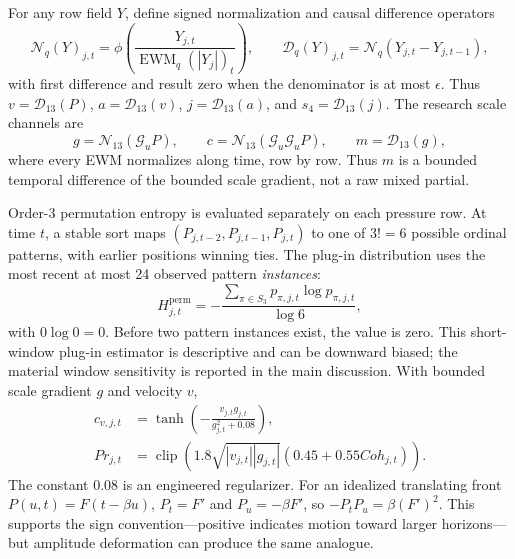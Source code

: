 \documentclass{article}
\newcommand{\pressure}{P}
\newcommand{\clip}{\operatorname{clip}}
\newcommand{\EWM}{\operatorname{EWM}}
\begin{document}
For any row field $Y$, define signed normalization and causal difference operators
\begin{equation}
\mathcal N_q(Y)_{j,t}=\phi\!\left(\frac{Y_{j,t}}{\EWM_q(|Y_j|)_t}\right),
\qquad
\mathcal D_q(Y)_{j,t}=\mathcal N_q(Y_{j,t}-Y_{j,t-1}),
\end{equation}
with first difference and result zero when the denominator is at most $\epsilon$. Thus $v=\mathcal D_{13}(\pressure)$, $a=\mathcal D_{13}(v)$, $j=\mathcal D_{13}(a)$, and $s_4=\mathcal D_{13}(j)$. The research scale channels are
\begin{equation}
g=\mathcal N_{13}(\mathcal G_u\pressure),\qquad
c=\mathcal N_{13}(\mathcal G_u\mathcal G_u\pressure),\qquad
m=\mathcal D_{13}(g),
\end{equation}
where every EWM normalizes along time, row by row. Thus $m$ is a bounded temporal difference of the bounded scale gradient, not a raw mixed partial.

Order-3 permutation entropy is evaluated separately on each pressure row. At time $t$, a stable sort maps $(\pressure_{j,t-2},\pressure_{j,t-1},\pressure_{j,t})$ to one of $3!=6$ possible ordinal patterns, with earlier positions winning ties. The plug-in distribution uses the most recent at most 24 observed pattern \emph{instances}:
\begin{equation}
H^{\mathrm{perm}}_{j,t}=-\frac{\sum_{\pi\in S_3}p_{\pi,j,t}\log p_{\pi,j,t}}{\log 6},
\end{equation}
with $0\log0=0$. Before two pattern instances exist, the value is zero. This short-window plug-in estimator is descriptive and can be downward biased; the material window sensitivity is reported in the main discussion. With bounded scale gradient $g$ and velocity $v$,
\begin{align}
c_{v,j,t}&=\tanh\left(-\frac{v_{j,t}g_{j,t}}{g_{j,t}^2+0.08}\right),\\
Pr_{j,t}&=\clip\left(1.8\sqrt{|v_{j,t}||g_{j,t}|}(0.45+0.55Coh_{j,t})\right).
\end{align}
The constant 0.08 is an engineered regularizer. For an idealized translating front $P(u,t)=F(t-\beta u)$, $P_t=F'$ and $P_u=-\beta F'$, so $-P_tP_u=\beta(F')^2$. This supports the sign convention---positive indicates motion toward larger horizons---but amplitude deformation can produce the same analogue.
\end{document}

